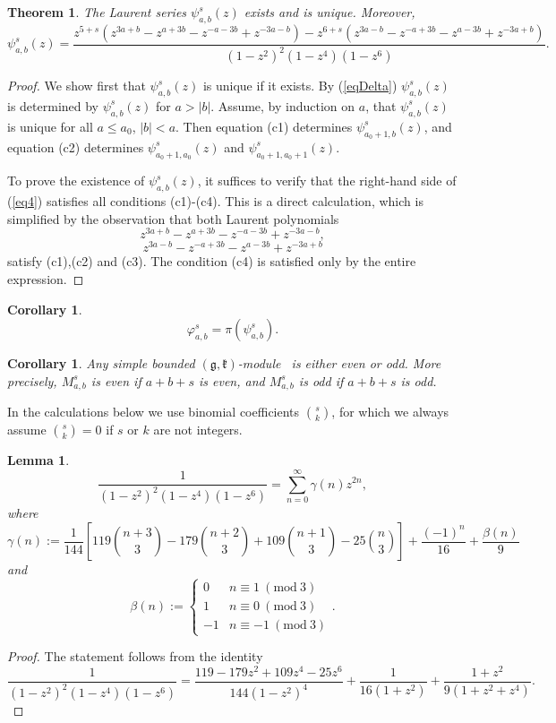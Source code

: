 \documentclass[12pt]{amsart}
\theoremstyle{plain} %
\newtheorem{theorem}[definition]{Theorem}
\newtheorem{lemma}[definition]{Lemma}
\newtheorem{corollary}[definition]{Corollary}
\newcommand{\kk}{\mathfrak{k}}
\renewcommand{\gg}{\mathfrak{g}}
\renewcommand{\phi}{\varphi}
\renewcommand{\mod}{\mathrm{mod~}}
\newcommand{\triplebrace}[6]{\left\{\begin{array}{ll}#1 & #2 \\ #3 & #4\\ #5 & #6\end{array}\right.}
\newcommand {\eqdef} {:=}
\newcommand{\refeq}[1]{(\ref{#1})}
\newcommand {\gkm} {$(\gg,\kk)$-module}
\begin{document}
\begin {theorem}\label{th206}
The Laurent series $\psi_{a,b}^s(z)$ exists and is unique. Moreover,
\begin{equation}\label{eq4}
\psi_{a,b}^{s}(z)=\frac{ z^{5+s}(z^{3a+b}-z^{a+3b}-z^{-a-3b}+z^{-3a-b})-z^{6+s}(z^{3a-b}-z^{-a+3b}-z^{a-3b}+z^{-3a+b})}{(1-z^2)^2(1-z^4)(1-z^6)}.
\end{equation}
\end{theorem}
\begin{proof}
We show first that $\psi_{a,b}^s(z)$ is unique if it exists. By \refeq{eqDelta} $\psi_{a,b}^s(z)$ is determined by $\psi_{a,b}^s(z)$ for $a>|b|$. Assume, by induction on $a$, that $\psi_{a,b}^s(z)$  is unique for all $a\leq a_0$, $|b|<a$. Then equation (c1) determines $\psi_{a_0+1,b}^s(z)$, and equation (c2) determines $\psi_{a_0+1,a_0}^s(z)$ and $\psi_{a_0+1,a_0+1}^s(z)$.

To prove the existence of $\psi_{a,b}^s(z)$, it suffices to verify that the right-hand side of \refeq{eq4} satisfies all conditions (c1)-(c4). This is a direct calculation, which is simplified by the observation that both Laurent polynomials
\[
z^{3a+b}-z^{a+3b}-z^{-a-3b}+z^{-3a-b},
\]
\[
z^{3a-b}-z^{-a+3b}-z^{a-3b}+z^{-3a+b}
\]
satisfy (c1),(c2) and (c3). The condition (c4) is satisfied only by the entire expression.
\end{proof}

\begin {corollary}\label{cor207}
\[
\phi_{a,b}^s=\pi(\psi_{a,b}^s).
\]
\end{corollary}

\begin {corollary}\label{cor207'}
Any simple bounded \gkm~ is either even or odd. More precisely, $M_{a,b}^s$ is even if $a+b+s$ is even, and $M_{a,b}^s$ is odd if $a+b+s$ is odd.
\end{corollary}

In the calculations below we use binomial coefficients $\binom{s}{k}$,
for which we always assume $\binom{s}{k}=0$ if $s$ or $k$ are not integers.

\begin {lemma}\label{le208}
\[
\frac{1}{(1-z^2)^2(1-z^4)(1-z^6)}=\sum_{n=0}^{\infty}\gamma(n)z^{2n},
\]
where
\[
\gamma(n)\eqdef \frac{1}{144}\left[ 119\binom{n+3}{3}-179\binom{n+2}{3}+109\binom{n+1}{3}-25\binom{n}{3}\right]+\frac{(-1)^n}{16}+\frac{\beta(n)}{9}
\]
and
\[
\beta(n)\eqdef\triplebrace{0}{n\equiv 1~(\mod 3)}{1}{n\equiv 0~(\mod 3)}{-1}{n\equiv -1~(\mod 3)}.
\]
\end{lemma}
\begin{proof}
The statement follows from the identity
\[
\frac{1}{(1-z^2)^2(1-z^4)(1-z^6)}=\frac{119-179z^2+109z^4-25z^6}{144(1-z^2)^4}+\frac{1}{16(1+z^2)}+\frac{1+z^2}{9(1+z^2+z^4)}.
\]
\end{proof}
\end{document}

